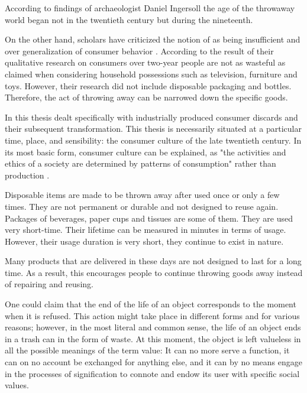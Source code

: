 According to findings of archaeologist Daniel Ingersoll the age of the throwaway world began not in the twentieth century but during the nineteenth. 

On the other hand, scholars have criticized the notion of  as being insufficient and over generalization of consumer behavior \cite{gregson2007identity}. According to the result of their qualitative research on consumers over two-year people are not as wasteful as claimed when considering household possessions such as television, furniture and toys. However, their research did not include disposable packaging and bottles. Therefore, the act of throwing away can be narrowed down the specific goods.

In this thesis dealt specifically with industrially produced consumer discards and their subsequent transformation. This thesis is necessarily situated at a particular time, place, and sensibility: the consumer culture of the late twentieth century. In its most basic form, consumer culture can be explained, as "the activities and ethics of a society are determined by patterns of consumption" rather than production .










%
%
Disposable items are made to be thrown away after used once or only a few times. They are not permanent or durable and not designed to reuse again. Packages of beverages, paper cups and tissues are some of them. They are used very short-time. Their lifetime can be measured in minutes in terms of usage. However, their usage duration is very short, they continue to exist in nature.

Many products that are delivered in these days are not designed to last for a long time. As a result, this encourages people to continue throwing goods away instead of repairing and reusing. 

One could claim that the end of the life of an object corresponds to the moment when it is refused. This action might take place in different forms and for various reasons; however, in the most literal and common sense, the life of an object ends in a trash can in the form of waste. At this moment, the object is left valueless in all the possible meanings of the term value: It can no more serve a function, it can on no account be exchanged for anything else, and it can by no means engage in the processes of signification to connote and endow its user with specific social values. 

